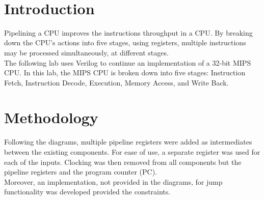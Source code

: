 \documentclass[twocolumn]{article}
\begin{document}
\

{\newpage}

\maketitle        


\section{Introduction}

Pipelining a CPU improves the instructions throughput in a CPU. By breaking down the CPU's actions into five stages, using registers, multiple instructions may be processed simultaneously, at different stages. \\

The following lab uses Verilog to continue an implementation of a 32-bit MIPS CPU. In this lab, the MIPS CPU is broken down into five stages: Instruction Fetch, Instruction Decode, Execution, Memory Access, and Write Back. \\
\section{Methodology}

Following the diagrams, multiple pipeline registers were added as intermediates between the existing components. For ease of use, a separate register was used for each of the inputs. Clocking was then removed from all components but the pipeline registers and the program counter (PC). \\

Moreover, an implementation, not provided in the diagrams, for jump functionality was developed provided the constraints. \\
\end{document}
